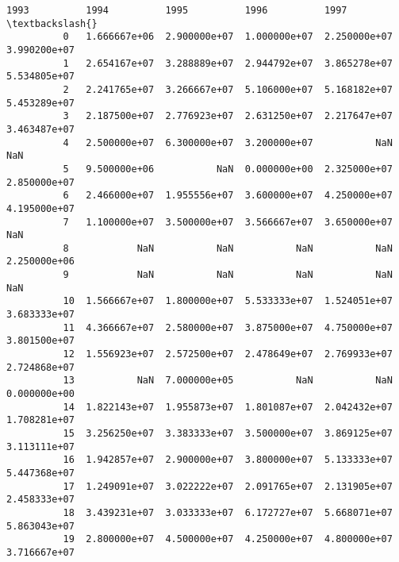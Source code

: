 \documentclass[11pt]{article}
\begin{document}
\begin{Verbatim}[commandchars=\\\{\}]
                      1993          1994          1995          1996          1997  \textbackslash{}
          0   1.666667e+06  2.900000e+07  1.000000e+07  2.250000e+07  3.990200e+07   
          1   2.654167e+07  3.288889e+07  2.944792e+07  3.865278e+07  5.534805e+07   
          2   2.241765e+07  3.266667e+07  5.106000e+07  5.168182e+07  5.453289e+07   
          3   2.187500e+07  2.776923e+07  2.631250e+07  2.217647e+07  3.463487e+07   
          4   2.500000e+07  6.300000e+07  3.200000e+07           NaN           NaN   
          5   9.500000e+06           NaN  0.000000e+00  2.325000e+07  2.850000e+07   
          6   2.466000e+07  1.955556e+07  3.600000e+07  4.250000e+07  4.195000e+07   
          7   1.100000e+07  3.500000e+07  3.566667e+07  3.650000e+07           NaN   
          8            NaN           NaN           NaN           NaN  2.250000e+06   
          9            NaN           NaN           NaN           NaN           NaN   
          10  1.566667e+07  1.800000e+07  5.533333e+07  1.524051e+07  3.683333e+07   
          11  4.366667e+07  2.580000e+07  3.875000e+07  4.750000e+07  3.801500e+07   
          12  1.556923e+07  2.572500e+07  2.478649e+07  2.769933e+07  2.724868e+07   
          13           NaN  7.000000e+05           NaN           NaN  0.000000e+00   
          14  1.822143e+07  1.955873e+07  1.801087e+07  2.042432e+07  1.708281e+07   
          15  3.256250e+07  3.383333e+07  3.500000e+07  3.869125e+07  3.113111e+07   
          16  1.942857e+07  2.900000e+07  3.800000e+07  5.133333e+07  5.447368e+07   
          17  1.249091e+07  3.022222e+07  2.091765e+07  2.131905e+07  2.458333e+07   
          18  3.439231e+07  3.033333e+07  6.172727e+07  5.668071e+07  5.863043e+07   
          19  2.800000e+07  4.500000e+07  4.250000e+07  4.800000e+07  3.716667e+07   
          

\end{Verbatim}
\end{document}
